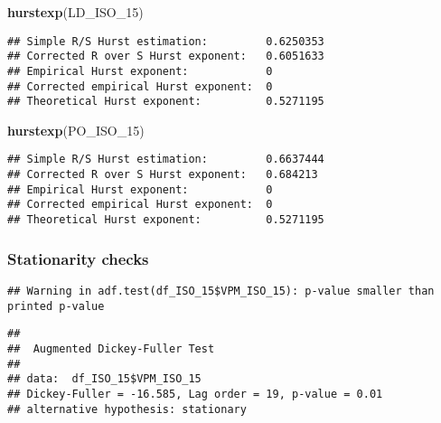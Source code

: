 \documentclass[
]{article}
\newenvironment{Shaded}{\begin{snugshade}}{\end{snugshade}}
\newcommand{\CommentTok}[1]{\textcolor[rgb]{0.56,0.35,0.01}{\textit{#1}}}
\newcommand{\FunctionTok}[1]{\textcolor[rgb]{0.13,0.29,0.53}{\textbf{#1}}}
\newcommand{\NormalTok}[1]{#1}
\newcommand{\SpecialCharTok}[1]{\textcolor[rgb]{0.81,0.36,0.00}{\textbf{#1}}}
\begin{document}
\begin{Shaded}
\begin{Highlighting}[]
\FunctionTok{hurstexp}\NormalTok{(LD\_ISO\_15)}
\end{Highlighting}
\end{Shaded}

\begin{verbatim}
## Simple R/S Hurst estimation:         0.6250353 
## Corrected R over S Hurst exponent:   0.6051633 
## Empirical Hurst exponent:            0 
## Corrected empirical Hurst exponent:  0 
## Theoretical Hurst exponent:          0.5271195
\end{verbatim}

\begin{Shaded}
\begin{Highlighting}[]
\FunctionTok{hurstexp}\NormalTok{(PO\_ISO\_15)}
\end{Highlighting}
\end{Shaded}

\begin{verbatim}
## Simple R/S Hurst estimation:         0.6637444 
## Corrected R over S Hurst exponent:   0.684213 
## Empirical Hurst exponent:            0 
## Corrected empirical Hurst exponent:  0 
## Theoretical Hurst exponent:          0.5271195
\end{verbatim}

\hypertarget{stationarity-checks}{%
\subsubsection{Stationarity checks}\label{stationarity-checks}}

\begin{Shaded}
\end{Shaded}

\begin{verbatim}
## Warning in adf.test(df_ISO_15$VPM_ISO_15): p-value smaller than printed p-value
\end{verbatim}

\begin{verbatim}
## 
##  Augmented Dickey-Fuller Test
## 
## data:  df_ISO_15$VPM_ISO_15
## Dickey-Fuller = -16.585, Lag order = 19, p-value = 0.01
## alternative hypothesis: stationary
\end{verbatim}
\end{document}
